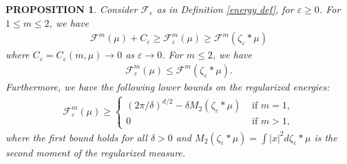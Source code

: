 \documentclass[11pt,leqno]{amsart}
\newtheorem{prop}[thm]{PROPOSITION}
\theoremstyle{definition}
\newcommand{\F}{\mathcal{F}}
\def\e{\varepsilon}
\def\F{\mathcal{F}}
\begin{document}
\begin{prop} \label{relative sizes lemma}
Consider $\F_\e$ as in Definition \ref{energy def}, for $\e \geq 0$. For $1 \leq m \leq 2$, we have
\begin{align} \label{relative sizes equation}
\F^m(\mu) + C_\e \geq \F^m_\e(\mu) \geq \F^m(\zeta_\e*\mu) 
\end{align}
where $C_\e= C_\e(m,\mu)  \to 0$ as $\e \to 0$. For $m \leq 2$, we have
\begin{align} \label{relative sizes equation 2}
 \F^m_\e(\mu) \leq \F^m(\zeta_\e*\mu) .
 \end{align}
 Furthermore, we have the following lower bounds on the regularized energies:
 \begin{align} \label{lower bounds}  \F^m_\e(\mu)  \geq  \begin{cases} (2\pi/\delta)^{d/2} - \delta M_2(\zeta_\e*\mu) &\text{ if } m =1, \\ 0 &\text{ if } m>1 ,\end{cases} 
 \end{align}
 where the first bound holds for all $\delta >0$ and $M_2(\zeta_\e*\mu) = \int |x|^2 d\zeta_\e *\mu$ is the second moment of the regularized measure.
\end{prop}
\end{document}
